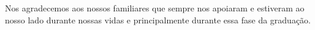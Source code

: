 Nos agradecemos aos nossos familiares que sempre nos apoiaram e estiveram ao nosso lado durante nossas vidas e principalmente durante essa fase da graduação.